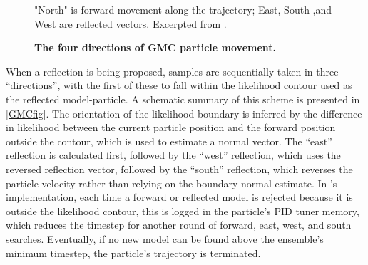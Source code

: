 \begin{figure}[!h]
    \caption{{\bf The four directions of GMC particle movement.}} "North" is forward movement along the trajectory; East, South ,and West are reflected vectors. Excerpted from \cite{Skilling2019}.
    \label{GMCfig}
\end{figure}

When a reflection is being proposed, samples are sequentially taken in three ``directions'', with the first of these to fall within the likelihood contour used as the reflected model-particle. A schematic summary of this scheme is presented in \autoref{GMCfig}. The orientation of the likelihood boundary is inferred by the difference in likelihood between the current particle position and the forward position outside the contour, which is used to estimate a normal vector. The ``east'' reflection is calculated first, followed by the ``west'' reflection, which uses the reversed reflection vector, followed by the ``south'' reflection, which reverses the particle velocity rather than relying on the boundary normal estimate. In \hyperref[chap:GMC]{}'s implementation, each time a forward or reflected model is rejected because it is outside the likelihood contour, this is logged in the particle's PID tuner memory, which reduces the timestep for another round of forward, east, west, and south searches. Eventually, if no new model can be found above the ensemble's minimum timestep, the particle's trajectory is terminated.

\FloatBarrier


